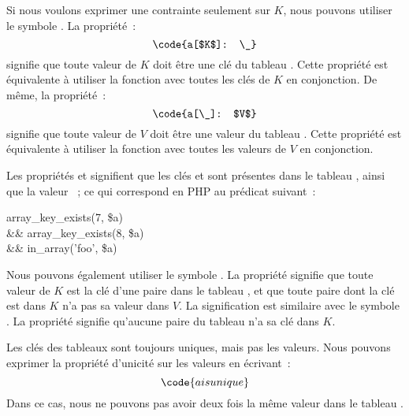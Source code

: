 Si nous voulons exprimer une contrainte seulement sur $K$, nous pouvons utiliser
le symbole \code{\_}. La propriété~:
%
$$\code{a[$K$]: \_}$$
%
signifie que toute valeur de $K$ doit être une clé du tableau . Cette
propriété est équivalente à utiliser la fonction  avec
toutes les clés de $K$ en conjonction.  De même, la propriété~:
%
$$\code{a[\_]: $V$}$$
%
signifie que toute valeur de $V$ doit être une valeur du tableau . Cette
propriété est équivalente à utiliser la fonction  avec toutes
les valeurs de $V$ en conjonction.

\begin{example}

Les propriétés  et  signifient que les clés
 et  sont présentes dans le tableau , ainsi que la
valeur ~; ce qui correspond en PHP au prédicat suivant~:
%
\begin{pre}
   array\_key\_exists(7, \$a) \\
\&\& array\_key\_exists(8, \$a) \\
\&\& in\_array('foo', \$a)
\end{pre}

\end{example}

Nous pouvons également utiliser le symbole \code{!:}. La propriété
 signifie que toute valeur de $K$ est la clé d'une paire dans
le tableau , et que toute paire dont la clé est dans $K$ n'a pas sa
valeur dans $V$. La signification est similaire avec le symbole \code{\_}. La
propriété  signifie qu'aucune paire du tableau  n'a sa
clé dans $K$.

Les clés des tableaux sont toujours uniques, mais pas les valeurs. Nous pouvons
exprimer la propriété d'unicité sur les valeurs en écrivant~:
%
$$\code{a is unique}$$
%
Dans ce cas, nous ne pouvons pas avoir deux fois la même valeur dans le tableau
.

